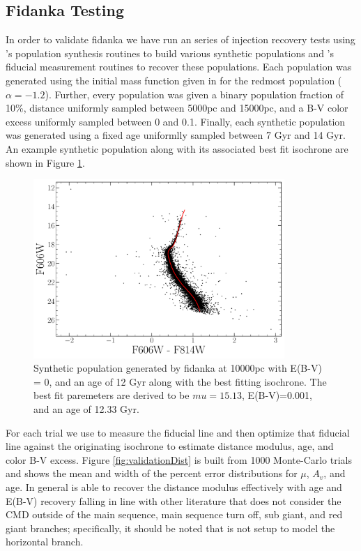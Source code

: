 \subsection{Fidanka Testing}
In order to validate fidanka we have run an series of injection recovery tests
using \fidanka's population synthesis routines to build various synthetic
populations and \fidanka's fiducial measurement routines to recover these
populations. Each population was generated using the initial mass function
given in \citep{Milone2012} for the redmost population ($\alpha=-1.2$).
Further, every population was given a binary population fraction of 10\%,
distance uniformly sampled between 5000pc and 15000pc, and a B-V color excess
uniformly sampled between 0 and 0.1. Finally, each synthetic population was
generated using a fixed age  uniformlly sampled between 7 Gyr and 14 Gyr. An
example synthetic population along with its associated best fit isochrone are
shown in Figure \ref{fig:ValidationBestFit}.

\begin{figure}
  \centering
  \includegraphics[width=0.85\textwidth]{figures/ngc2808/ExtractedIsoFit.pdf}
  \caption{Synthetic population generated by fidanka at 10000pc with E(B-V) =
  0, and an age of 12 Gyr along with the best fitting isochrone. The best fit
  paremeters are derived to be $mu=15.13$, E(B-V)=0.001, and an age of 12.33
  Gyr.}
  \label{fig:ValidationBestFit}
\end{figure}

For each trial we use \fidanka to measure the fiducial line and then optimize
that fiducial line against the originating isochrone to estimate distance
modulus, age, and color B-V excess. Figure \ref{fig:validationDist} is built
from 1000 Monte-Carlo trials and shows the mean and width of the percent
error distributions for $\mu$, $A_{v}$, and age. In general \fidanka is able to
recover the distance modulus effectively with age and E(B-V) recovery falling in
line with other literature that does not consider the CMD outside of the main
sequence, main sequence turn off, sub giant, and red giant branches;
specifically, it should be noted that \fidanka is not setup to model the
horizontal branch.

